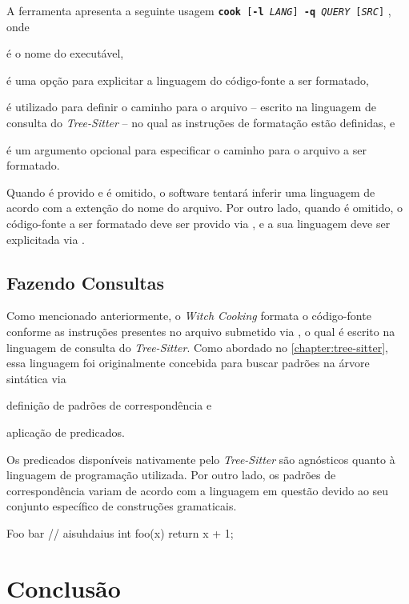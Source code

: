 \documentclass
 [11pt,a4paper,english,brazil,openright,sumario=tradicional,twoside]
 {abntex2}
\newcommand{\treesitter}{\textit{Tree-Sitter}\xspace}
\newcommand{\witchcooking}{\textit{Witch Cooking}\xspace}
\begin{document}
 A ferramenta apresenta a seguinte usagem
 \boxed
  {\texttt{\textbf{cook}
   [\textbf{-l} \textit{LANG}]
   \textbf{-q} \textit{QUERY}
   [\textit{SRC}]}}%
 , onde
 \begin{inparaenum}
  \item {} é o nome do executável,
  \item {} é uma opção para
        explicitar a linguagem do código-fonte a ser formatado,
  \item {} é utilizado para definir o
        caminho para o arquivo -- escrito na linguagem de consulta do
        \treesitter{} -- no qual as instruções de formatação estão definidas, e
  \item {} é um argumento opcional para
        especificar o caminho para o arquivo a ser formatado.
 \end{inparaenum}
 Quando  é provido e
  é omitido, o software tentará
 inferir uma linguagem de acordo com a extenção do nome do arquivo. Por outro
 lado, quando  é omitido, o código-fonte a ser
 formatado deve ser provido via \textit{}, e a sua linguagem
 deve ser explicitada via .

 \section{Fazendo Consultas}

 Como mencionado anteriormente, o \witchcooking formata o código-fonte conforme
 as instruções presentes no arquivo submetido via
 , o qual é escrito na linguagem de
 consulta do \treesitter. Como abordado no \autoref{chapter:tree-sitter}, essa
 linguagem foi originalmente concebida para buscar padrões na árvore sintática
 via
 \begin{inparaenum}
  \item definição de padrões de correspondência e
  \item aplicação de predicados.
 \end{inparaenum}
 Os predicados disponíveis nativamente pelo \treesitter são agnósticos quanto à
 linguagem de programação utilizada. Por outro lado, os padrões de
 correspondência variam de acordo com a linguagem em questão devido ao seu
 conjunto específico de construções gramaticais.

 \begin{codesnippet}{Foo bar}
  // aisuhdaius
  int foo(x) {
    return x + 1;
  }
 \end{codesnippet}


 \chapter{Conclusão}


 \postextual
 \printbibliography
\end{document}
